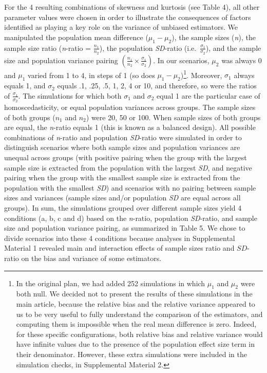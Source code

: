 \documentclass[
  english,
  man,floatsintext]{apa6}
\begin{document}
For the 4 resulting combinations of skewness and kurtosis (see Table 4), all other parameter values were chosen in order to illustrate the consequences of factors identified as playing a key role on the variance of unbiased estimators. We manipulated the population mean difference (\(\mu_1-\mu_2\)), the sample sizes (\emph{n}), the sample size ratio (\emph{n}-ratio = \(\frac{n_1}{n_2}\)), the population \emph{SD}-ratio (i.e.~\(\frac{\sigma_1}{\sigma_2}\)), and the sample size and population variance pairing \(\left(\frac{n_1}{n_2}\times\frac{\sigma_1}{\sigma_2} \right)\). In our scenarios, \(\mu_2\) was always 0 and \(\mu_1\) varied from 1 to 4, in steps of 1 (so does \(\mu_1-\mu_2\))\footnote{In the original plan, we had added 252 simulations in which $\mu_1$ and $\mu_2$ were both null. We decided not to present the results of these simulations in the main article, because the relative bias and the relative variance appeared to us to be very useful to fully understand the comparison of the estimators, and computing them is impossible when the real mean difference is zero. Indeed, for these specific configurations, both relative bias and relative variance would have infinite values due to the presence of the population effect size term in their denominator. However, these extra simulations were included in the simulation checks, in Supplemental Material 2. }. Moreover, \(\sigma_1\) always equals 1, and \(\sigma_2\) equals .1, .25, .5, 1, 2, 4 or 10, and therefore, so were the ratios of \(\frac{\sigma_1}{\sigma_2}\). The simulations for which both \(\sigma_1\) and \(\sigma_2\) equal 1 are the particular case of homoscedasticity, or equal population variances across groups. The sample sizes of both groups (\(n_1\) and \(n_2\)) were 20, 50 or 100. When sample sizes of both groups are equal, the \emph{n}-ratio equals 1 (this is known as a balanced design). All possible combinations of \emph{n}-ratio and population \emph{SD}-ratio were simulated in order to distinguish scenarios where both sample sizes and population variances are unequal across groups (with positive pairing when the group with the largest sample size is extracted from the population with the largest \emph{SD}, and negative pairing when the group with the smallest sample size is extracted from the population with the smallest \emph{SD}) and scenarios with no pairing between sample sizes and variances (sample sizes and/or population \emph{SD} are equal across all groups). In sum, the simulations grouped over different sample sizes yield 4 conditions (a, b, c and d) based on the \emph{n}-ratio, population \emph{SD}-ratio, and sample size and population variance pairing, as summarized in Table 5. We chose to divide scenarios into these 4 conditions because analyses in Supplemental Material 1 revealed main and interaction effects of sample sizes ratio and \(SD\)-ratio on the bias and variance of some estimators.
\end{document}
